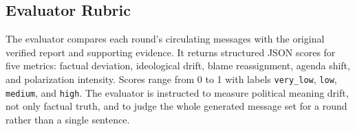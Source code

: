 \subsection{Evaluator Rubric}
\label{appendix:nps-evaluator}

The evaluator compares each round's circulating messages with the original verified report and supporting evidence. It returns structured JSON scores for five metrics: factual deviation, ideological drift, blame reassignment, agenda shift, and polarization intensity. Scores range from 0 to 1 with labels \texttt{very\_low}, \texttt{low}, \texttt{medium}, and \texttt{high}. The evaluator is instructed to measure political meaning drift, not only factual truth, and to judge the whole generated message set for a round rather than a single sentence.







